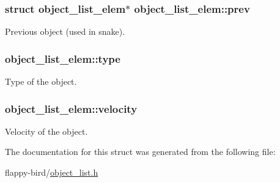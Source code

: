 \subsubsection[{\texorpdfstring{prev}{prev}}]{\setlength{\rightskip}{0pt plus 5cm}struct {\bf object\+\_\+list\+\_\+elem}$\ast$ object\+\_\+list\+\_\+elem\+::prev}\hypertarget{structobject__list__elem_a71a54270804fe79669e899752f3e2992}{}\label{structobject__list__elem_a71a54270804fe79669e899752f3e2992}
Previous object (used in snake). 
\subsubsection[{\texorpdfstring{type}{type}}]{ object\+\_\+list\+\_\+elem\+::type}\hypertarget{structobject__list__elem_aa84efc5c7fcf3887328cce7dc72fda67}{}\label{structobject__list__elem_aa84efc5c7fcf3887328cce7dc72fda67}
Type of the object. 
\subsubsection[{\texorpdfstring{velocity}{velocity}}]{ object\+\_\+list\+\_\+elem\+::velocity}\hypertarget{structobject__list__elem_affba049401aaf1488ce02106158a6b4b}{}\label{structobject__list__elem_affba049401aaf1488ce02106158a6b4b}
Velocity of the object. 

The documentation for this struct was generated from the following file\+:\begin{DoxyCompactItemize}
\item 
flappy-\/bird/\hyperlink{object__list_8h}{object\+\_\+list.\+h}\end{DoxyCompactItemize}
